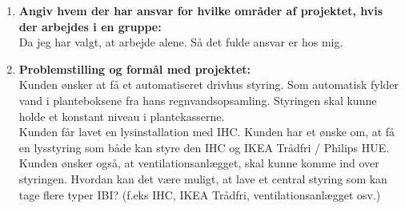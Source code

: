 \begin{enumerate}
    \item \textbf{Angiv hvem der har ansvar for hvilke områder af projektet, hvis der arbejdes i en
    gruppe:}\\ Da jeg har valgt, at arbejde alene. Så det fulde ansvar er hos mig.
    \item \textbf{Problemstilling og formål med projektet:} \\ 
    Kunden ønsker at få et automatiseret drivhus styring. Som
    automatisk fylder vand i planteboksene fra hans regnvandsopsamling.
    Styringen skal kunne holde et konstant niveau i plantekasserne. \\
    Kunden får lavet en lysinstallation med IHC. 
    Kunden har et ønske om, at få en lysstyring som både kan styre den IHC og
    IKEA Trådfri / Philips HUE. 
    \\
    Kunden ønsker også, at ventilationsanlægget, skal kunne komme ind over styringen.
    Hvordan kan det være muligt, at lave et central styring som kan tage flere typer IBI? (f.eks IHC, IKEA Trådfri, ventilationsanlægget osv.)


\end{enumerate}
